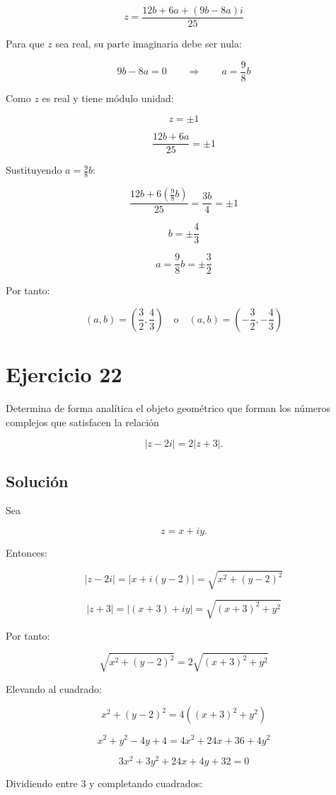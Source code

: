 \documentclass[fleqn]{article}
\begin{document}
		\[
		z
		=
		\frac{12b+6a+(9b-8a)i}{25}
		\]

		Para que $z$ sea real, su parte imaginaria debe ser nula:

		\[
		9b-8a=0
		\qquad\Longrightarrow\qquad
		a=\frac{9}{8}b
		\]

		Como $z$ es real y tiene módulo unidad:

		\[
		z=\pm1
		\]

		\[
		\frac{12b+6a}{25}=\pm1
		\]

		Sustituyendo $a=\frac{9}{8}b$:

		\[
		\frac{12b+6\left(\frac{9}{8}b\right)}{25}
		=
		\frac{3b}{4}
		=
		\pm1
		\]

		\[
		b=\pm\frac{4}{3}
		\]

		\[
		a=\frac{9}{8}b
		=
		\pm\frac{3}{2}
		\]

		Por tanto:

		\[
		\boxed{
		(a,b)=
		\left(\frac{3}{2},\frac{4}{3}\right)
		\quad\text{o}\quad
		(a,b)=
		\left(-\frac{3}{2},-\frac{4}{3}\right)
		}
		\]
	
	\section{Ejercicio 22}
		Determina de forma analítica el objeto geométrico que forman los números complejos que satisfacen la relación

		\[
		|z-2i|=2|z+3|.
		\]

		\subsection{Solución}

		Sea

		\[
		z=x+iy.
		\]

		Entonces:

		\[
		|z-2i|
		=
		|x+i(y-2)|
		=
		\sqrt{x^2+(y-2)^2}
		\]

		\[
		|z+3|
		=
		|(x+3)+iy|
		=
		\sqrt{(x+3)^2+y^2}
		\]

		Por tanto:

		\[
		\sqrt{x^2+(y-2)^2}
		=
		2\sqrt{(x+3)^2+y^2}
		\]

		Elevando al cuadrado:

		\[
		x^2+(y-2)^2
		=
		4\left((x+3)^2+y^2\right)
		\]

		\[
		x^2+y^2-4y+4
		=
		4x^2+24x+36+4y^2
		\]

		\[
		3x^2+3y^2+24x+4y+32=0
		\]

		Dividiendo entre $3$ y completando cuadrados:
\end{document}
